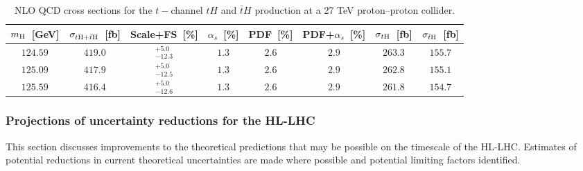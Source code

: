 \begin{table}
\centering
\begin{tabular}{cccccccc}%
\toprule
$m_{\rm H}$~[GeV] & $\sigma_{t{\rm H}+\bar t{\rm H}}$~[fb] & Scale+FS~[\%] &
$\alpha_s$~[\%] & PDF~[\%] & PDF+${\alpha_s}$~[\%] & $\sigma_{t{\rm H}}$~[fb] & 
$\sigma_{\bar t{\rm H}}$~[fb]\\
\midrule
$124.59$ & $419.0$ & $^{+5.0}_{-12.3}$ & $1.3$ & $2.6$ & $2.9$ & $263.3$ & $155.7$\\
$125.09$ & $417.9$ & $^{+5.0}_{-12.5}$ & $1.3$ & $2.6$ & $2.9$ & $262.8$ & $155.1$\\
$125.59$ & $416.4$ & $^{+5.0}_{-12.6}$ & $1.3$ & $2.6$ & $2.9$ & $261.8$ & $154.7$\\
\bottomrule
\end{tabular}%
\caption{NLO QCD cross sections for the $t-$channel $tH$ and $\bar t H$
production at a 27 TeV proton--proton collider.}
\label{tab:tH27_xsec}
\end{table}




\subsubsection{Projections of uncertainty reductions for the HL-LHC}
\label{sec:hl-lhc}

This section discusses improvements to the theoretical predictions that may be
possible on the timescale of the HL-LHC.  Estimates of potential reductions in
current theoretical uncertainties are made where possible and potential limiting
factors identified.

